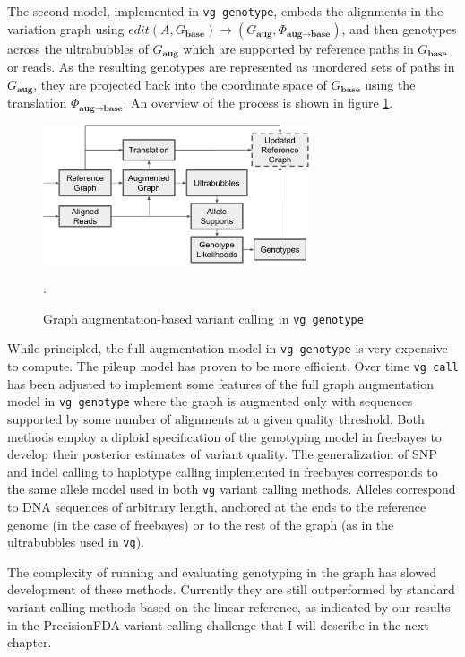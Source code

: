 The second model, implemented in {\tt vg genotype}, embeds the alignments in the variation graph using $edit(A, G_\textbf{base}) \to (G_\textbf{aug}, \Phi_{\textbf{aug}\to\textbf{base}})$, and then genotypes across the ultrabubbles of $G_\textbf{aug}$ which are supported by reference paths in $G_\textbf{base}$ or reads.
As the resulting genotypes are represented as unordered sets of paths in $G_\textbf{aug}$, they are projected back into the coordinate space of $G_\textbf{base}$ using the translation $\Phi_{\textbf{aug}\to\textbf{base}}$.
An overview of the process is shown in figure \ref{fig:vg_genotype}.

\begin{figure}[htbp!]
  \centering
  \includegraphics[width=0.7\textwidth]{Chapter2/Figs/vg_genotype.pdf}
  \caption{
    Graph augmentation-based variant calling in {\tt vg genotype}
    }
  \label{fig:vg_genotype}.
\end{figure}

While principled, the full augmentation model in {\tt vg genotype} is very expensive to compute.
The pileup model has proven to be more efficient.
Over time {\tt vg call} has been adjusted to implement some features of the full graph augmentation model in {\tt vg genotype} where the graph is augmented only with sequences supported by some number of alignments at a given quality threshold.
Both methods employ a diploid specification of the genotyping model in freebayes \cite{garrison2012haplotype} to develop their posterior estimates of variant quality.
The generalization of SNP and indel calling to haplotype calling implemented in freebayes corresponds to the same allele model used in both {\tt vg} variant calling methods.
Alleles correspond to DNA sequences of arbitrary length, anchored at the ends to the reference genome (in the case of freebayes) or to the rest of the graph (as in the ultrabubbles used in {\tt vg}).

The complexity of running and evaluating genotyping in the graph has slowed development of these methods.
Currently they are still outperformed by standard variant calling methods based on the linear reference, as indicated by our results in the PrecisionFDA variant calling challenge that I will describe in the next chapter.

